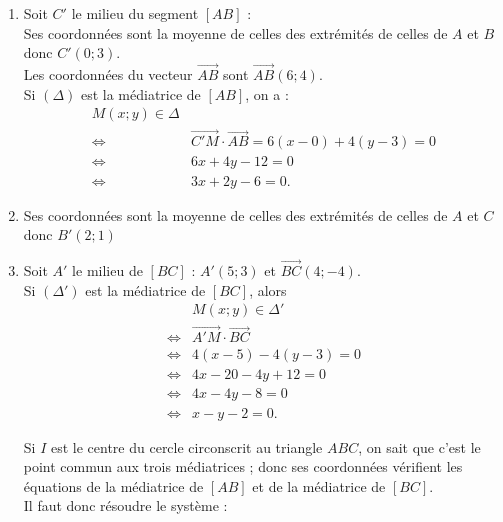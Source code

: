 \documentclass[10pt]{article}
\begin{document}
\begin{enumerate}
	\item 	 Soit \(C'\) le milieu du segment \([AB]\) : \\
		 Ses coordonnées sont la moyenne de celles des extrémités de celles de $A$ et $B$ donc \(C'(0 ; 3)\).\\
		  Les coordonnées du vecteur \(\overrightarrow{AB}\) sont \(\overrightarrow{AB}(6 ; 4)\).\\
		   Si \((\Delta)\) est la médiatrice de \([AB]\), on a :		
	\begin{align*}
	M(x ; y) \in \Delta\\
	 \iff& \overrightarrow{C'M} \cdot \overrightarrow{AB} = 6(x - 0) + 4(y - 3) = 0 \\
	 \iff& 6x + 4y - 12 = 0\\
	  \iff& 3x + 2y - 6 = 0.
	\end{align*}
	
		
		
	\item  Ses coordonnées sont la moyenne de celles des extrémités de celles de $A$ et $C$  donc \(B'(2 ; 1)\)
		
		\item Soit \(A'\) le milieu de \([BC]\) :  \(A'(5 ; 3)\) et \(\overrightarrow{BC}(4 ; -4)\).\\
		 Si \((\Delta')\) est la médiatrice de \([BC]\), alors
	\begin{align*}
	&	M(x ; y) \in \Delta'\\
	 \iff &\overrightarrow{A'M} \cdot \overrightarrow{BC}\\
	  \iff& 4(x - 5) - 4(y - 3) = 0 \\
	  \iff& 4x - 20 - 4y + 12 = 0\\
	   \iff& 4x - 4y - 8 = 0 \\
	   \iff& x - y - 2 = 0.
\end{align*}
		
		Si \(I\) est le centre du cercle circonscrit au triangle \(ABC\), on sait que c'est le point commun aux trois médiatrices ; donc ses coordonnées vérifient les équations de la médiatrice de \([AB]\) et de la médiatrice de \([BC]\). \\
		Il faut donc résoudre le système :
		

\end{enumerate}
\end{document}
